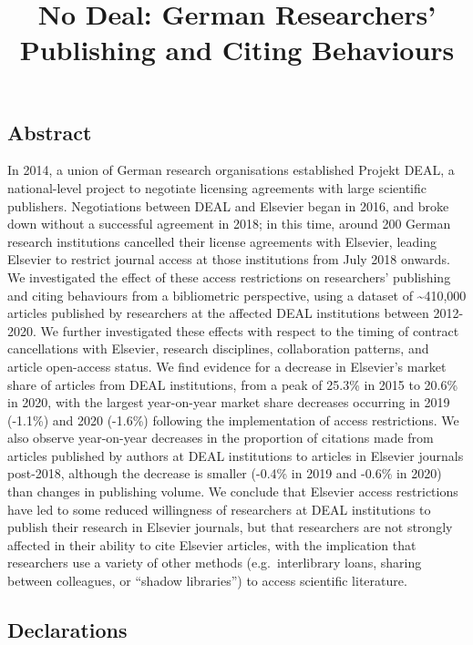 \documentclass[
]{article}
\title{No Deal: \deleted{Investigating the Influence of Restricted Access to Elsevier Journals on }German Researchers' Publishing and Citing Behaviours\added{ after Contract Negotiations and Restricted Access to Elsevier Journals}}
\author{}
\date{\vspace{-2.5em}}
\begin{document}
\maketitle

\hypertarget{abstract}{%
\subsection{Abstract}\label{abstract}}

In 2014, a union of German research organisations established Projekt DEAL, a national-level project to negotiate licensing agreements with large scientific publishers. Negotiations between DEAL and Elsevier began in 2016, and broke down without a successful agreement in 2018; in this time, around 200 German research institutions cancelled their license agreements with Elsevier, leading Elsevier to restrict journal access at those institutions from July 2018 onwards. We investigated the effect of these access restrictions on researchers' publishing and citing behaviours from a bibliometric perspective, using a dataset of \textasciitilde410,000 articles published by researchers at the affected DEAL institutions between 2012-2020. We further investigated these effects with respect to the timing of contract cancellations with Elsevier, research disciplines, collaboration patterns, and article open-access status. We find evidence for a decrease in Elsevier's market share of articles from DEAL institutions, from a peak  of 25.3\% in 2015 to 20.6\% in 2020, with the largest year-on-year market share decreases occurring in 2019 (-1.1\%) and 2020 (-1.6\%) following the implementation of access restrictions. We also observe year-on-year decreases in the proportion of citations made from articles published by authors at DEAL institutions to articles in Elsevier journals post-2018, although the decrease is smaller (-0.4\% in 2019 and -0.6\% in 2020) than changes in publishing volume. We conclude that Elsevier access restrictions have led to some reduced willingness of researchers at DEAL institutions to publish their research in Elsevier journals, but that researchers are not strongly affected in their ability to cite Elsevier articles, with the implication that researchers use a variety of other methods (e.g.~interlibrary loans, sharing between colleagues, or ``shadow libraries'') to access scientific literature.

\hypertarget{declarations}{%
\subsection{Declarations}\label{declarations}}
\end{document}
